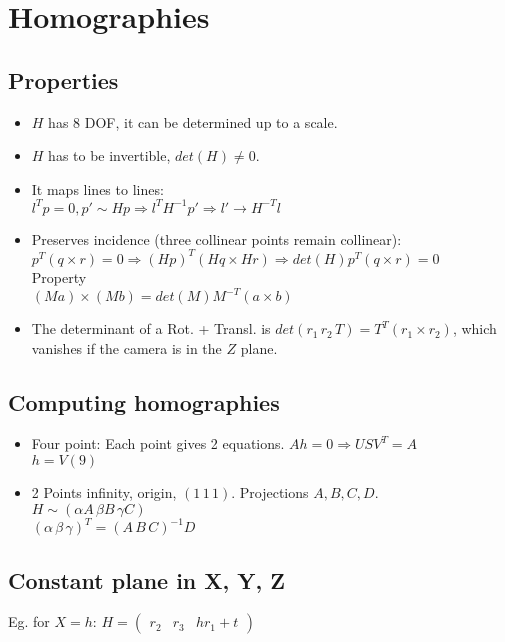 \section{Homographies}
\subsection*{Properties}
\begin{itemize}
  \item $H$ has 8 DOF, it can be determined up to a scale.
  \item $H$ has to be invertible, $det(H) \neq 0$.
  \item It maps lines to lines:\\
    $l^T p = 0, p' \sim H p \Rightarrow l^T H^{-1} p' \Rightarrow l'
    \rightarrow H^{-T} l$
  \item Preserves incidence (three collinear points remain collinear):\\
    $p^T(q\times r) = 0 \Rightarrow (H p)^T (H q \times H r) \Rightarrow
    det(H) p^T (q \times r) = 0$\\
    Property \\
    $(M a) \times (M b) = det(M) M^{-T} (a \times b)$
  \item The determinant of a Rot. + Transl. is $det(r_1\,r_2\,T) =
    T^T(r_1\times r_2)$, which vanishes if the camera is in the $Z$
    plane.
\end{itemize}

\subsection*{Computing homographies}
\begin{itemize}
  \item Four point: Each point gives 2 equations.
    $A h = 0 \Rightarrow U S V^T = A$\\
    $h = V(9)$
  \item 2 Points infinity, origin, $(1\,1\,1)$. Projections $A, B, C, D$.\\
    $H \sim (\alpha A \, \beta B \, \gamma C)$\\
    $(\alpha \, \beta \, \gamma)^T = (A \, B \, C)^{-1} D$
\end{itemize}

\subsection*{Constant plane in X, Y, Z}
Eg. for $X = h$:  $H = \begin{pmatrix}
  r_2 & r_3 & h r_1 + t
\end{pmatrix}$

